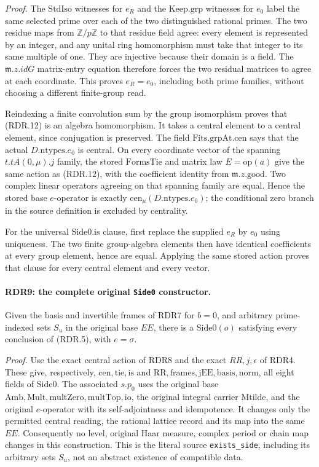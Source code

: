\emph{Proof.}
The \(\mathrm{StdIso}\) witnesses for \(e_R\) and the
\(\mathrm{Keep.grp}\) witnesses for \(e_0\) label the same
selected prime over each of the two distinguished rational primes.
The two residue maps from \(\mathbb Z/p\mathbb Z\) to that
residue field agree: every element is represented by an integer,
and any unital ring homomorphism must take that integer to its
same multiple of one.  They are injective because their domain
is a field.  The \(\mathfrak m.z.idG\) matrix-entry equation
therefore forces the two residual matrices to agree at each
coordinate.  This proves \(e_R=e_0\), including both prime
families, without choosing a different finite-group read.

Reindexing a finite convolution sum by the group isomorphism
proves that (RDR.12) is an algebra homomorphism.  It takes a
central element to a central element, since conjugation is
preserved.  The field \(\mathrm{Fits.grpAt.cen}\) says that
the actual \(D.\mathrm{ntypes}.e_0\) is central.  On every
coordinate vector of the spanning \(t.tA(0,\mu).j\) family,
the stored \(\mathrm{FormsTie}\) and matrix law \(E=\mathrm{op}(a)\)
give the same action as (RDR.12), with the coefficient identity
from \(\mathfrak m.z.\mathrm{good}\).  Two complex linear
operators agreeing on that spanning family are equal.  Hence
the stored base \(e\)-operator is exactly
\(\mathrm{cen}_\mu(D.\mathrm{ntypes}.e_0)\); the conditional
zero branch in the source definition is excluded by centrality.

For the universal \(\mathrm{Side0.is}\) clause, first replace
the supplied \(e_R\) by \(e_0\) using uniqueness.  The two
finite group-algebra elements then have identical coefficients
at every group element, hence are equal.  Applying the same
stored action proves that clause for every central element
and every vector.

\paragraph{RDR9: the complete original \texttt{Side0} constructor.}
\label{claim:RDR9}
Given the basis and invertible frames of RDR7 for \(b=0\),
and arbitrary prime-indexed sets \(S_u\) in the original base
\(EE\), there is a \(\mathrm{Side0}(o)\) satisfying every
conclusion of (RDR.5), with \(e=\sigma\).

\emph{Proof.}
Use the exact central action of RDR8 and the exact
\(RR,j,\epsilon\) of RDR4.  These give, respectively,
\(\mathrm{cen,tie,is}\) and
\(\mathrm{RR,frames,jEE,basis,norm}\), all eight fields
of \(\mathrm{Side0}\).  The associated \(s.p_0\) uses
the original base \(\mathrm{Amb,Mult,multZero,multTop,io}\),
the original integral carrier \(\mathrm{Mtilde}\), and
the original \(e\)-operator with its self-adjointness and
idempotence.  It changes only the permitted central reading,
the rational lattice record and its map into the same \(EE\).
Consequently no level, original Haar measure, complex period
or chain map changes in this construction.  This is the
literal source \texttt{exists\_side}, including its arbitrary
sets \(S_u\), not an abstract existence of compatible data.

